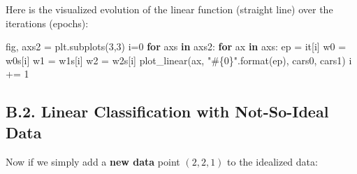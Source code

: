 \documentclass[
  letterpaper,
]{scrbook}
\newenvironment{Shaded}{\begin{snugshade}}{\end{snugshade}}
\newcommand{\BuiltInTok}[1]{\textcolor[rgb]{0.00,0.23,0.31}{#1}}
\newcommand{\ControlFlowTok}[1]{\textcolor[rgb]{0.00,0.23,0.31}{\textbf{#1}}}
\newcommand{\DecValTok}[1]{\textcolor[rgb]{0.68,0.00,0.00}{#1}}
\newcommand{\KeywordTok}[1]{\textcolor[rgb]{0.00,0.23,0.31}{\textbf{#1}}}
\newcommand{\NormalTok}[1]{\textcolor[rgb]{0.00,0.23,0.31}{#1}}
\newcommand{\OperatorTok}[1]{\textcolor[rgb]{0.37,0.37,0.37}{#1}}
\newcommand{\SpecialCharTok}[1]{\textcolor[rgb]{0.37,0.37,0.37}{#1}}
\newcommand{\StringTok}[1]{\textcolor[rgb]{0.13,0.47,0.30}{#1}}
\begin{document}
Here is the visualized evolution of the linear function (straight line)
over the iterations (epochs):

\begin{Shaded}
\begin{Highlighting}[]
\NormalTok{fig, axs2 }\OperatorTok{=}\NormalTok{ plt.subplots(}\DecValTok{3}\NormalTok{,}\DecValTok{3}\NormalTok{) }
\NormalTok{i}\OperatorTok{=}\DecValTok{0}
\ControlFlowTok{for}\NormalTok{ axs }\KeywordTok{in}\NormalTok{ axs2:}
    \ControlFlowTok{for}\NormalTok{ ax }\KeywordTok{in}\NormalTok{ axs: }
\NormalTok{        ep }\OperatorTok{=}\NormalTok{ it[i]}
\NormalTok{        w0 }\OperatorTok{=}\NormalTok{ w0s[i]}
\NormalTok{        w1 }\OperatorTok{=}\NormalTok{ w1s[i]}
\NormalTok{        w2 }\OperatorTok{=}\NormalTok{ w2s[i]}
\NormalTok{        plot\_linear(ax, }\StringTok{"\#}\SpecialCharTok{\{0\}}\StringTok{"}\NormalTok{.}\BuiltInTok{format}\NormalTok{(ep), cars0, cars1)}
\NormalTok{        i }\OperatorTok{+=} \DecValTok{1}
\end{Highlighting}
\end{Shaded}

\subsection*{B.2. Linear Classification with Not-So-Ideal
Data}\label{b.2.-linear-classification-with-not-so-ideal-data}

Now if we simply add a \textbf{new data} point \((2,2,1)\) to the
idealized data:
\end{document}
